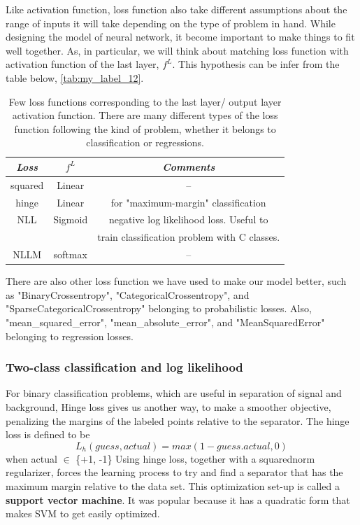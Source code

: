 Like activation function, loss function also take different assumptions about the range of inputs it will take depending on the type of problem in hand. While designing the model of neural network, it become important to make things to fit well together. As, in particular, we will think about matching loss function with activation function of the last layer, $f^L$. This hypothesis can be infer from the table below, \autoref{tab:my_label_12}.\\
\begin{table}[h]
    \centering
    \begin{tabular}{ccc} \hline
   \textit{   Loss }  & \textit{ $f^L$} & \textit{Comments}\\ \hline
      squared   &  Linear &  --\\
      hinge  &  Linear &  for "maximum-margin" classification\\
      NLL &   Sigmoid &   negative log likelihood loss. Useful to \\ 
      &    &       train classification problem with C classes.\\
      NLLM & softmax & -- \\
      
    \end{tabular}
    \caption{Few loss functions corresponding to the last layer/ output layer activation function. There are many different types of the loss function following the kind of problem, whether it belongs to classification or regressions. }
    \label{tab:my_label_12}
\end{table}
There are also other loss function we have used to make our model better, such as "BinaryCrossentropy", "CategoricalCrossentropy", and
"SparseCategoricalCrossentropy" belonging to probabilistic losses. Also, "mean\_squared\_error", "mean\_absolute\_error", and "MeanSquaredError" belonging to regression losses.
 
\subsubsection{Two-class classification and log likelihood}

For binary classification problems, which are useful in separation of signal and background, Hinge loss gives us another way, to make a smoother objective, penalizing the margins of the labeled points relative to the separator. The hinge loss is defined to be
\begin{equation*}
    L_h(guess, actual) = max(1-guess.actual,0)
\end{equation*}
when actual $\in$ \{+1, -1\}
 Using hinge loss, together with a squarednorm regularizer, forces the learning process to try and find a separator that has the
maximum margin relative to the data set. This optimization set-up is called a \textbf{support vector machine}. It was popular because it has a quadratic form that makes SVM to get easily optimized.

